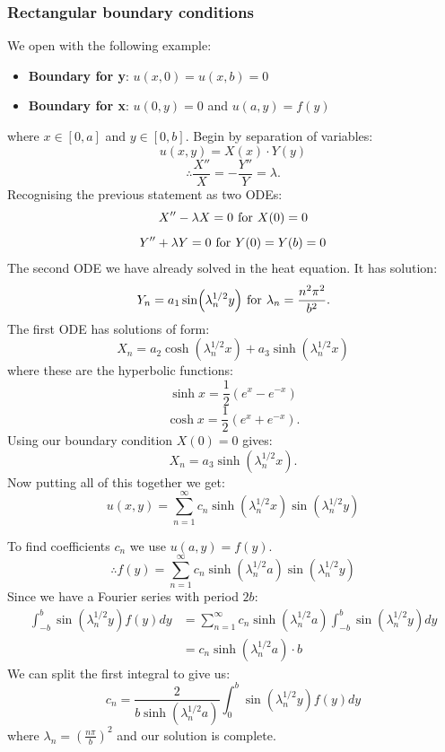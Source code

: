 \documentclass{article}
\begin{document}
\subsubsection{Rectangular boundary conditions}
We open with the following example:
\begin{itemize}
    \item \textbf{Boundary for y}: $u(x,0)=u(x,b)=0$

    \item \textbf{Boundary for x}: $u(0,y)=0$ and $u(a,y)=f(y)$
\end{itemize}
where $x\in[0,a]$ and $y\in[0,b]$.
Begin by separation of variables:
$$u(x,y)=X(x)\cdot Y(y)$$
$$\therefore\frac{X''}{X}=-\frac{Y''}{Y}=\lambda.$$
Recognising the previous statement as two ODEs:
$$X''-\lambda X=0\hspace{0.05in}
\text{for}\hspace{0.05in}X(0)=0$$
$$Y''+\lambda Y=0\hspace{0.05in}\text{for}
\hspace{0.05in}Y(0)=Y(b)=0$$
The second ODE we have already solved in the heat equation. It has solution:
$$Y_n=a_1\sin(\lambda_n^{1/2} y)\hspace{0.05in}
\text{for}\hspace{0.05in}\lambda_n=\frac{n^2\pi^2}{b^2}.$$
The first ODE has solutions of form:
$$X_n=a_2\cosh(\lambda_n^{1/2}x)
+a_3\sinh(\lambda_n^{1/2}x)$$
where these are the hyperbolic functions:
$$\sinh x=\frac{1}{2}(e^x-e^{-x})$$
$$\cosh x=\frac{1}{2}(e^x+e^{-x}).$$
Using our boundary condition $X(0)=0$ gives:
$$X_n=a_3\sinh(\lambda_n^{1/2} x).$$
Now putting all of this together we get:
$$u(x,y)=\sum_{n=1}^{\infty}c_n\sinh(\lambda_n^{1/2} x)
\sin(\lambda_n^{1/2} y)$$

\newpage

To find coefficients $c_n$ we use $u(a,y)=f(y)$.
$$\therefore f(y)=\sum_{n=1}^{\infty}c_n\sinh(\lambda_n^{1/2} a)
\sin(\lambda_n^{1/2} y)$$
Since we have a Fourier series with period $2b$:
\begin{align*}
    \int_{-b}^{b}\sin(\lambda_n^{1/2} y)f(y)dy
    &=\sum_{n=1}^{\infty}c_n\sinh(\lambda_n^{1/2} a)
    \int_{-b}^{b}\sin(\lambda_n^{1/2} y)dy \\
    &=c_n\sinh(\lambda_n^{1/2} a)\cdot b
\end{align*}
We can split the first integral to give us:
$$c_n=\frac{2}{b\sinh(\lambda_n^{1/2} a)}
\int_{0}^{b}\sin(\lambda_n^{1/2} y)f(y)dy$$
where $\lambda_n=\left(\frac{n\pi}{b}\right)^2$
and our solution is complete.
\end{document}
